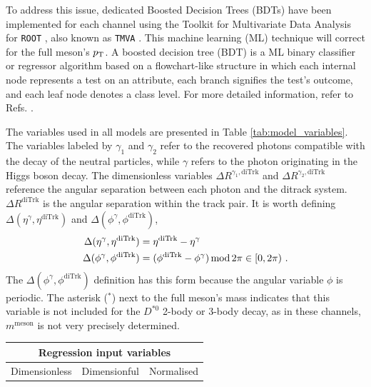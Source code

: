 \begin{myitemlist}
    To address this issue, dedicated Boosted Decision Trees (BDTs) have been implemented for each channel using the Toolkit for Multivariate Data Analysis for \verb+ROOT+ \cite{CERN:root}, also known as \verb+TMVA+ \cite{TMVA:2007ngy}. This machine learning (ML) technique will correct for the full meson's $p_\text{T}$. A boosted decision tree (BDT) is a ML binary classifier or regressor algorithm based on a flowchart-like structure in which each internal node represents a test on an attribute, each branch signifies the test's outcome, and each leaf node denotes a class level. For more detailed information, refer to Refs. \cite{TMVA:2007ngy, Coadou:2022nsh}.

    The variables used in all models are presented in Table \ref{tab:model_variables}. The variables labeled by $\gamma_1$ and $\gamma_2$ refer to the recovered photons compatible with the decay of the neutral particles, while $\gamma$ refers to the photon originating in the Higgs boson decay. The dimensionless variables $\Delta R^{\gamma_1, \text{diTrk}}$ and $\Delta R^{\gamma_2, \text{diTrk}}$ reference the angular separation between each photon and the ditrack system. $\Delta R^{\text{diTrk}}$ is the angular separation within the track pair. It is worth defining $\Delta(\eta^{\gamma}, \eta^{\text{diTrk}})$ and $\Delta(\phi^{\gamma}, \phi^{\text{diTrk}})$,
    \begin{equation*}
        \begin{aligned}
        \Delta(\eta^{\gamma}, \eta^{\text{diTrk}}) &= \eta^{\text{diTrk}} - \eta^{\gamma} \\
        \Delta(\phi^{\gamma}, \phi^{\text{diTrk}}) &= (\phi^{\text{diTrk}} - \phi^{\gamma}) \operatorname{mod} 2\pi \in[0, 2\pi)\ .
        \end{aligned}
    \end{equation*}
    The $\Delta(\phi^{\gamma}, \phi^{\text{diTrk}})$ definition has this form because the angular variable $\phi$ is periodic. The asterisk ($^*$) next to the full meson's mass indicates that this variable is not included for the $D^{*0}$ 2-body or 3-body decay, as in these channels, $m^{\text{meson}}$ is not very precisely determined. 
    \begin{table}[!ht]
        \centering
        \begin{tabular}{|c|c|c|}
            \hline
            \multicolumn{3}{|c|}{\cellcolor{lightgray} Regression input variables} \\ \hline
            \cellcolor{lightgray}Dimensionless  &\cellcolor{lightgray}Dimensionful  &\cellcolor{lightgray}Normalised            \\\hline

\end{tabular}
\end{table}
\end{myitemlist}
